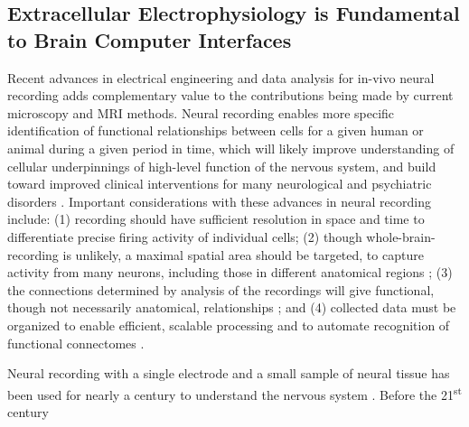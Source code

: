 \documentclass[11pt]{article}
\newcommand{\subsectionwithindent}[1]{
    \subsection*{#1}
    \hspace{\parindent} %
}
\begin{document}
\subsectionwithindent{Extracellular Electrophysiology is Fundamental to Brain Computer Interfaces}
Recent advances in electrical engineering and data analysis for in-vivo neural recording adds complementary value to the contributions being made by current microscopy and MRI methods. Neural recording enables more specific identification of functional relationships between cells for a given human or animal during a given period in time, which will likely improve understanding of cellular underpinnings of high-level function of the nervous system, and build toward improved clinical interventions for many neurological and psychiatric disorders \cite{kobayashi2025connections, zhang2025neds,musk2019integrated, card2024neuroprosthesis}. Important considerations with these advances in neural recording include: (1) recording should have sufficient resolution in space and time to differentiate precise firing activity of individual cells; (2) though whole-brain-recording is unlikely, a maximal spatial area should be targeted, to capture activity from many neurons, including those in different anatomical regions \cite{jun2017probes}; (3) the connections determined by analysis of the recordings will give functional, though not necessarily anatomical, relationships \cite{ciarrusta2023connectome}; and (4) collected data must be organized to enable efficient, scalable processing and to automate recognition of functional connectomes \cite{pachitariu2016kilosort, buccino2020spikeinterface}.

Neural recording with a single electrode and a small sample of neural tissue has been used for nearly a century to understand the nervous system \cite{piccolino1997galvani, adrian1954olfaction}. Before the 21\textsuperscript{st} century 



\end{document}
